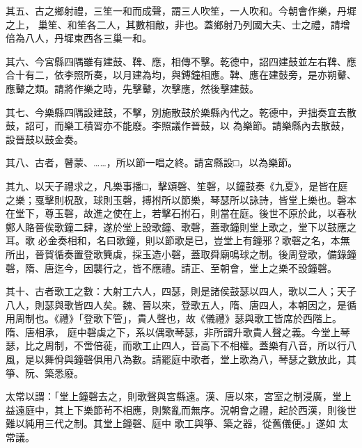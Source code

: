 \begin{pinyinscope}
 其五、古之鄉射禮，三笙一和而成聲，謂三人吹笙，一人吹和。今朝會作樂，丹墀之上，
 巢笙、和笙各二人，其數相敵，非也。蓋鄉射乃列國大夫、士之禮，請增倍為八人，丹墀東西各三巢一和。



 其六、今宮縣四隅雖有建鼓、鞞、應，相傳不擊。乾德中，詔四建鼓並左右鞞、應合十有二，依李照所奏，以月建為均，與鎛鐘相應。鞞、應在建鼓旁，是亦朔鼙、應鼙之類。請將作樂之時，先擊鼙，次擊應，然後擊建鼓。



 其七、今樂縣四隅設建鼓，不擊，別施散鼓於樂縣內代之。乾德中，尹拙奏宜去散鼓，詔可，而樂工積習亦不能廢。李照議作晉鼓，以
 為樂節。請樂縣內去散鼓，設晉鼓以鼓金奏。



 其八、古者，瞽蒙、……，所以節一唱之終。請宮縣設□，以為樂節。



 其九、以天子禮求之，凡樂事播□，擊頌磬、笙磬，以鐘鼓奏《九夏》，是皆在庭之樂；戛擊則柷敔，球則玉磬，搏拊所以節樂，琴瑟所以詠詩，皆堂上樂也。磬本在堂下，尊玉磬，故進之使在上，若擊石拊石，則當在庭。後世不原於此，以春秋鄭人賂晉俟歌鐘二肆，遂於堂上設歌鐘、歌磬，蓋歌鐘則堂上歌之，堂下以鼓應之耳。歌
 必金奏相和，名曰歌鐘，則以節歌是已，豈堂上有鐘邪？歌磬之名，本無所出，晉賀循奏置登歌簨虡，採玉造小磬，蓋取舜廟鳴球之制。後周登歌，備錄鐘磬，隋、唐迄今，因襲行之，皆不應禮。請正、至朝會，堂上之樂不設鐘磬。



 其十、古者歌工之數：大射工六人，四瑟，則是諸侯鼓瑟以四人，歌以二人；天子八人，則瑟與歌皆四人矣。魏、晉以來，登歌五人，隋、唐四人，本朝因之，是循用周制也。《禮》「登歌下管」，貴人聲也，故《儀禮》瑟與歌工皆席於西階上。隋、唐相承，
 庭中磬虡之下，系以偶歌琴瑟，非所謂升歌貴人聲之義。今堂上琴瑟，比之周制，不啻倍蓰，而歌工止四人，音高下不相權。蓋樂有八音，所以行八風，是以舞佾與鐘磬俱用八為數。請罷庭中歌者，堂上歌為八，琴瑟之數放此，其箏、阮、築悉廢。



 太常以謂：「堂上鐘磬去之，則歌聲與宮縣遠。漢、唐以來，宮室之制浸廣，堂上益遠庭中，其上下樂節茍不相應，則繁亂而無序。況朝會之禮，起於西漢，則後世難以純用三代之制。其堂上鐘磬、庭中
 歌工與箏、築之器，從舊儀便。」遂如
 太常議。



\end{pinyinscope}